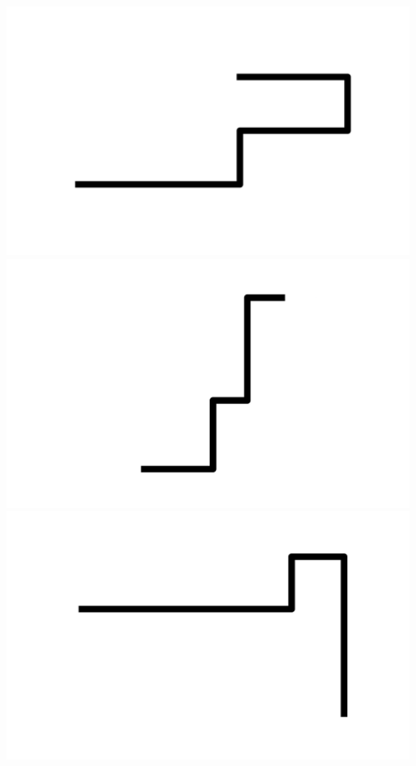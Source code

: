 \documentclass[]{report}
\begin{document}
\includegraphics[scale=.1]{pictures/21/state_cluster_shapes_91.pdf} 
\includegraphics[scale=.1]{pictures/21/state_cluster_shapes_92.pdf} 
\includegraphics[scale=.1]{pictures/21/state_cluster_shapes_93.pdf} 
\end{document}
